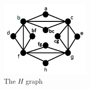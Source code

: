 \begin{figure}[htb]	
\center%
\includegraphics[width=4.5cm]{./img/gadgetBase.png}
\caption{The $H$ graph}
\label{fig:gadgetBase}
\end{figure}
